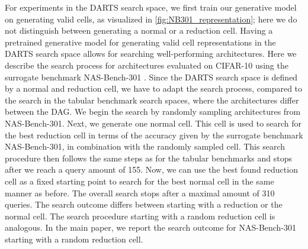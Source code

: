 \documentclass[runningheads]{llncs}
\begin{document}
For experiments in the DARTS \cite{2018DARTS} search space, we first train our generative model on generating valid cells, as visualized in \autoref{fig:NB301_representation}; here we do not distinguish between generating a normal or a reduction cell. Having a pretrained generative model for generating valid cell representations in the DARTS search space allows for searching well-performing architectures.
Here we describe the search process for architectures evaluated on CIFAR-10 using the surrogate benchmark NAS-Bench-301 \cite{2020NB301}. Since the DARTS search space is defined by a normal and reduction cell, we have to adapt the search process, compared to the search in the tabular benchmark search spaces, where the architectures differ between the DAG. We begin the search by randomly sampling  architectures from NAS-Bench-301. Next, we generate one normal cell.
This cell is used to search for the best reduction cell in terms of the accuracy given by the surrogate benchmark NAS-Bench-301, in combination with the randomly sampled cell.
This search procedure then follows the same steps as for the tabular benchmarks and stops after we reach a query amount of 155.
Now, we can use the best found reduction cell as a fixed starting point to search for the best normal cell in the same manner as before.
The overall search stops after a maximal amount of 310 queries.
The search outcome differs between starting with a reduction or the normal cell.
The search procedure starting with a random reduction cell is analogous.
In the main paper, we report the search outcome for NAS-Bench-301 \cite{2020NB301} starting with a random reduction cell.
\end{document}

